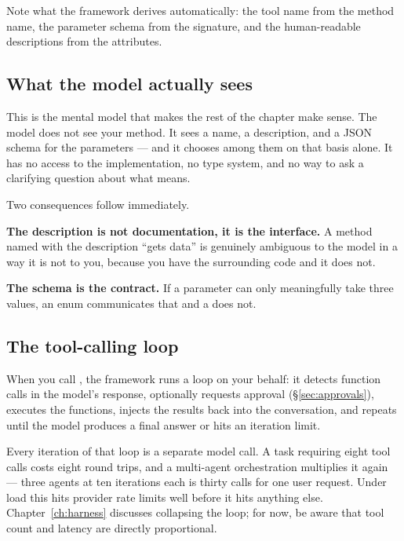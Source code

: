 Note what the framework derives automatically: the tool name from the method
name, the parameter schema from the signature, and the human-readable
descriptions from the \api{[Description]} attributes.

\subsection{What the model actually sees}

This is the mental model that makes the rest of the chapter make sense. The model
does not see your method. It sees a name, a description, and a JSON schema for
the parameters --- and it chooses among them on that basis alone. It has no
access to the implementation, no type system, and no way to ask a clarifying
question about what  means.

Two consequences follow immediately.

\textbf{The description is not documentation, it is the interface.} A method named
 with the description ``gets data'' is genuinely ambiguous to the
model in a way it is not to you, because you have the surrounding code and it does
not.

\textbf{The schema is the contract.} If a parameter can only meaningfully take
three values, an enum communicates that and a  does not.

\subsection{The tool-calling loop}

When you call , the framework runs a loop on your behalf: it detects
function calls in the model's response, optionally requests approval
(\S\ref{sec:approvals}), executes the functions, injects the results back into the
conversation, and repeats until the model produces a final answer or hits an
iteration limit.

\begin{warning}
Every iteration of that loop is a separate model call. A task requiring eight tool
calls costs eight round trips, and a multi-agent orchestration multiplies it
again --- three agents at ten iterations each is thirty calls for one user
request. Under load this hits provider rate limits well before it hits anything
else. Chapter~\ref{ch:harness} discusses collapsing the loop; for now, be aware
that tool count and latency are directly proportional.
\end{warning}

